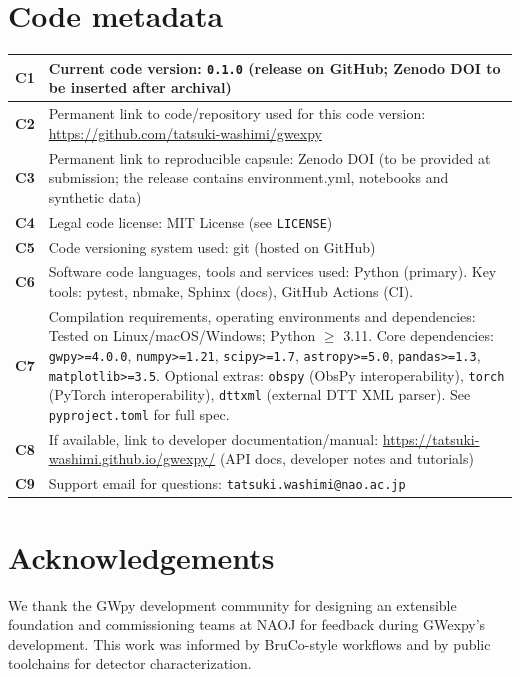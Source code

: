 \documentclass[preprint,12pt,a4paper]{elsarticle}
\begin{document}
\section*{Code metadata}
\begin{table}[htbp]
\centering
\begin{tabular}{|l|p{10cm}|}
\hline
\textbf{C1} & Current code version: \texttt{0.1.0} (release on GitHub; Zenodo DOI to be inserted after archival) \\\hline
\textbf{C2} & Permanent link to code/repository used for this code version: \url{https://github.com/tatsuki-washimi/gwexpy} \\\hline
\textbf{C3} & Permanent link to reproducible capsule: Zenodo DOI (to be provided at submission; the release contains environment.yml, notebooks and synthetic data) \\\hline
\textbf{C4} & Legal code license: MIT License (see \texttt{LICENSE}) \\\hline
\textbf{C5} & Code versioning system used: git (hosted on GitHub) \\\hline
\textbf{C6} & Software code languages, tools and services used: Python (primary). Key tools: pytest, nbmake, Sphinx (docs), GitHub Actions (CI). \\\hline
\textbf{C7} & Compilation requirements, operating environments and dependencies: Tested on Linux/macOS/Windows; Python $\ge$ 3.11. Core dependencies: \texttt{gwpy>=4.0.0}, \texttt{numpy>=1.21}, \texttt{scipy>=1.7}, \texttt{astropy>=5.0}, \texttt{pandas>=1.3}, \texttt{matplotlib>=3.5}. Optional extras: \texttt{obspy} (ObsPy interoperability), \texttt{torch} (PyTorch interoperability), \texttt{dttxml} (external DTT XML parser). See \texttt{pyproject.toml} for full spec. \\\hline
\textbf{C8} & If available, link to developer documentation/manual: \url{https://tatsuki-washimi.github.io/gwexpy/} (API docs, developer notes and tutorials) \\\hline
\textbf{C9} & Support email for questions: \texttt{tatsuki.washimi@nao.ac.jp} \\\hline
\end{tabular}
\end{table}

\section*{Acknowledgements}
We thank the GWpy development community for designing an extensible foundation and commissioning teams at NAOJ for feedback during GWexpy's development.  This work was informed by BruCo-style workflows and by public toolchains for detector characterization.
\end{document}
